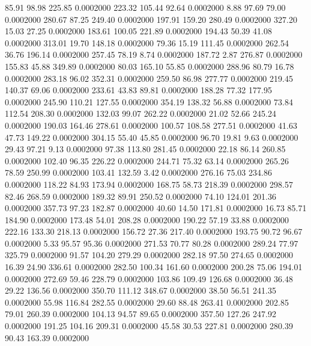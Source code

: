   85.91   98.98  225.85   0.0002000
 223.32  105.44   92.64   0.0002000
   8.88   97.69   79.00   0.0002000
 280.67   87.25  249.40   0.0002000
 197.91  159.20  280.49   0.0002000
 327.20   15.03   27.25   0.0002000
 183.61  100.05  221.89   0.0002000
 194.43   50.39   41.08   0.0002000
 313.01   19.70  148.18   0.0002000
  79.36   15.19  111.45   0.0002000
 262.54   36.76  196.14   0.0002000
 257.45   78.19    8.74   0.0002000
 187.72    2.87  276.87   0.0002000
 155.83   45.88  349.89   0.0002000
  80.03  165.10   55.85   0.0002000
 288.96   80.79   16.78   0.0002000
 283.18   96.02  352.31   0.0002000
 259.50   86.98  277.77   0.0002000
 219.45  140.37   69.06   0.0002000
 233.61   43.83   89.81   0.0002000
 188.28   77.32  177.95   0.0002000
 245.90  110.21  127.55   0.0002000
 354.19  138.32   56.88   0.0002000
  73.84  112.54  208.30   0.0002000
 132.03   99.07  262.22   0.0002000
  21.02   52.66  245.24   0.0002000
 190.03  164.46  278.61   0.0002000
 100.57  108.58  277.51   0.0002000
  41.63   47.73  149.22   0.0002000
 304.15   55.40   45.85   0.0002000
  96.70   19.81    9.63   0.0002000
  29.43   97.21    9.13   0.0002000
  97.38  113.80  281.45   0.0002000
  22.18   86.14  260.85   0.0002000
 102.40   96.35  226.22   0.0002000
 244.71   75.32   63.14   0.0002000
 265.26   78.59  250.99   0.0002000
 103.41  132.59    3.42   0.0002000
 276.16   75.03  234.86   0.0002000
 118.22   84.93  173.94   0.0002000
 168.75   58.73  218.39   0.0002000
 298.57   82.46  268.59   0.0002000
 189.32   89.91  250.52   0.0002000
  74.10  124.01  201.36   0.0002000
 357.73   97.23  182.87   0.0002000
  40.60   14.50  171.81   0.0002000
  16.73   85.71  184.90   0.0002000
 173.48   54.01  208.28   0.0002000
 190.22   57.19   33.88   0.0002000
 222.16  133.30  218.13   0.0002000
 156.72   27.36  217.40   0.0002000
 193.75   90.72   96.67   0.0002000
   5.33   95.57   95.36   0.0002000
 271.53   70.77   80.28   0.0002000
 289.24   77.97  325.79   0.0002000
  91.57  104.20  279.29   0.0002000
 282.18   97.50  274.65   0.0002000
  16.39   24.90  336.61   0.0002000
 282.50  100.34  161.60   0.0002000
 200.28   75.06  194.01   0.0002000
 272.69   59.46  228.79   0.0002000
 103.86  109.49  126.68   0.0002000
  36.48   29.22  136.56   0.0002000
 350.70  111.12  348.67   0.0002000
  38.50   56.51  241.35   0.0002000
  55.98  116.84  282.55   0.0002000
  29.60   88.48  263.41   0.0002000
 202.85   79.01  260.39   0.0002000
 104.13   94.57   89.65   0.0002000
 357.50  127.26  247.92   0.0002000
 191.25  104.16  209.31   0.0002000
  45.58   30.53  227.81   0.0002000
 280.39   90.43  163.39   0.0002000
